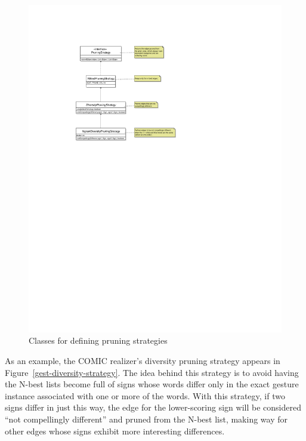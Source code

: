 \documentclass[11pt]{article}
\begin{document}
\begin{figure}%
\begin{center}
\mbox{}
\includegraphics[width=\textwidth]{pruner-class.pdf} 
\caption{Classes for defining pruning strategies}
\label{pruner-class}
\end{center}
\end{figure}

As an example, the COMIC realizer's diversity pruning strategy appears
in Figure~\ref{gest-diversity-strategy}. The idea behind this strategy
is to avoid having the N-best lists become full of signs whose words
differ only in the exact gesture instance associated with one or more of
the words. With this strategy, if two signs differ in just this way, the
edge for the lower-scoring sign will be considered ``not compellingly
different'' and pruned from the N-best list, making way for other edges
whose signs exhibit more interesting differences.
\end{document}
